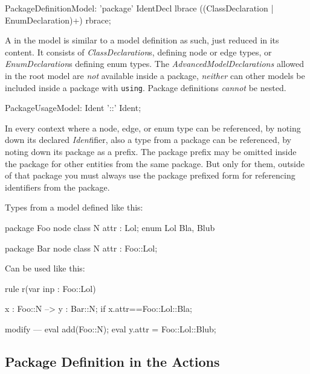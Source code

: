 \begin{rail}
  PackageDefinitionModel: 'package' IdentDecl lbrace
	                   ((ClassDeclaration
  									 | EnumDeclaration)+)
										rbrace;
\end{rail}

A  in the model is similar to a model definition as such, just reduced in its content.
It consists of \emph{ClassDeclaration}s, defining node or edge types, or \emph{EnumDeclaration}s defining enum types.
The \emph{AdvancedModelDeclarations} allowed in the root model are \emph{not} available inside a package, \emph{neither} can other models be included inside a package with \texttt{using}.
Package definitions \emph{cannot} be nested.

\begin{rail}
  PackageUsageModel: Ident '::' Ident;
\end{rail}

In every context where a node, edge, or enum type can be referenced,
by noting down its declared \emph{Ident}ifier, 
also a type from a package can be referenced,
by noting down its package as a prefix.
The package prefix may be omitted inside the package for other entities from the same package.
But only for them, outside of that package you must always use the package prefixed form for referencing identifiers from the package.

\begin{example}
Types from a model defined like this:
	\begin{grgen}
package Foo {
	node class N {
		attr : Lol;
	}
	enum Lol {
		Bla,
		Blub
	}
}

package Bar {
	node class N {
		attr : Foo::Lol;
	}	
}
	\end{grgen}
Can be used like this:
	\begin{grgen}
rule r(var inp : Foo::Lol) {
	x : Foo::N --> y : Bar::N;
	if{ x.attr==Foo::Lol::Bla; }

	modify {
	---
		eval{ add(Foo::N); }
		eval{ y.attr = Foo::Lol::Blub; }
	}
}	
	\end{grgen}
\end{example}
	
\subsection{Package Definition in the Actions}\label{sub:packageaction} 

